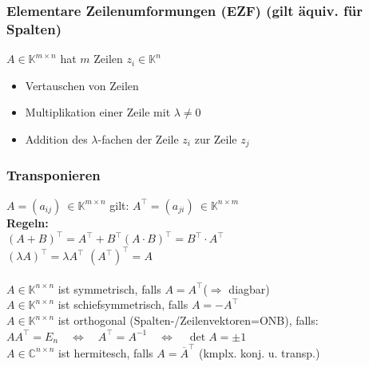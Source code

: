 \documentclass[6pt,a4paper]{scrartcl}
\begin{document}
\begin{multicols*}{4}
\subsubsection{Elementare Zeilenumformungen (EZF) (gilt äquiv. für Spalten)}
$A \in \mathbb K^{m\times n}$ hat $m$ Zeilen $z_i\in \mathbb K^n$
\begin{itemize}\itemsep0pt
\item Vertauschen von Zeilen
\item Multiplikation einer Zeile mit $\lambda\ne 0$ 
\item Addition des $\lambda$-fachen der Zeile $z_i$ zur Zeile $z_j$
\end{itemize}

\subsubsection{Transponieren}
$A=(a_{ij})\ \in \mathbb K^{m\times n}$ gilt: $A^\top=(a_{ji})\ \in \mathbb K^{n\times m}$\\
\textbf{Regeln:}\\
$(A+B)^\top=A^\top+B^\top$\qquad $(A\cdot B)^\top=B^\top\cdot A^\top$\qquad \\
$(\lambda A)^\top=\lambda A^\top$ \qquad \qquad \qquad $(A^\top)^\top=A$\\
\\
$A\in \mathbb K^{n\times n}$ ist symmetrisch, falls $A=A^\top$\qquad ($\Rightarrow$ diagbar)\\
$A\in \mathbb K^{n\times n}$ ist schiefsymmetrisch, falls $A=-A^\top$\\
$A\in \mathbb K^{n\times n}$ ist orthogonal (Spalten-/Zeilenvektoren=ONB), falls:\\
$AA^\top=E_n \quad \Leftrightarrow \quad A^\top=A^{-1} \quad \Leftrightarrow \quad \det A=\pm 1$\\
$A\in \mathbb C^{n\times n}$ ist hermitesch, falls $A=\overline{A}^\top$  \quad (kmplx. konj. u. transp.)



\end{multicols*}
\end{document}
